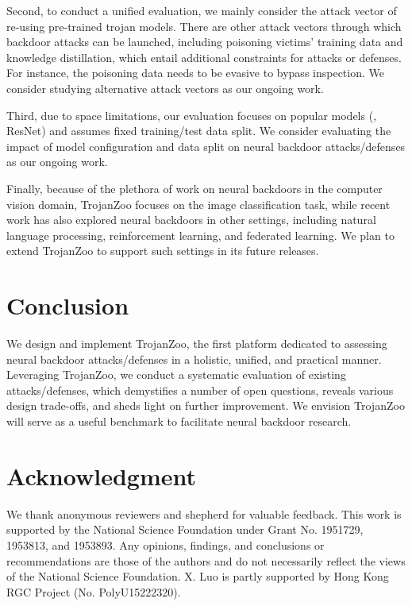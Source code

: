 \documentclass[compsoc,conference,a4paper,10pt,times]{IEEEtran}
\newcommand{\system}{{\sc \small TrojanZoo}\xspace}
\begin{document}
Second, to conduct a unified evaluation, we mainly consider the attack vector of re-using pre-trained trojan models. There are other attack vectors through which backdoor attacks can be launched, including poisoning victims' training data and knowledge distillation, which entail additional constraints for attacks or defenses. For instance, the poisoning data needs to be evasive to bypass inspection. We consider studying alternative attack vectors as our ongoing work.

Third, due to space limitations, our evaluation focuses on popular \dnn models (\meg, ResNet) and assumes fixed training/test data split. We consider evaluating the impact of model configuration and data split on neural backdoor attacks/defenses as our ongoing work.

Finally, because of the plethora of work on neural backdoors in the computer vision domain, \system focuses on the image classification task, while recent work has also explored neural backdoors in other settings, including natural language processing, reinforcement learning, and federated learning. We plan to extend \system to support such settings in its future releases.


\section{Conclusion}
\label{sec:conclusion}



We design and implement \system, the first platform dedicated to assessing neural backdoor attacks/defenses in a holistic, unified, and practical manner. Leveraging \system, we conduct a systematic evaluation of existing attacks/defenses, which demystifies a number of open questions, reveals various design trade-offs, and sheds light on further improvement. We envision \system will serve as a useful benchmark to facilitate neural backdoor research.

\section*{Acknowledgment}
We thank anonymous reviewers and shepherd for valuable feedback. This work is supported by the National Science Foundation under Grant No. 1951729, 1953813, and 1953893. Any opinions, findings, and conclusions or recommendations are those of the authors and do not necessarily reflect the views of the National Science Foundation. X. Luo is partly supported by Hong Kong RGC Project (No. PolyU15222320).
\end{document}
